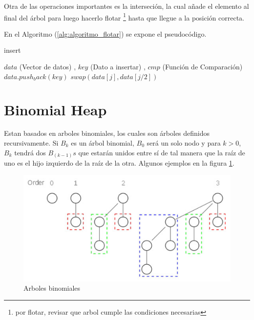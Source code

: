 \documentclass[a4paper,10pt]{article}
\begin{document}
	Otra de las operaciones importantes es la interseción, la cual añade el elemento al final del árbol para luego hacerlo flotar \footnote{ por flotar, revisar que arbol cumple las condiciones necesarias} hasta que llegue a la posición correcta.

En el Algoritmo (\ref{alg:algoritmo_flotar}) se expone el pseudocódigo.

\begin{algorithm}[!h]
	
	\caption{insert} \label{alg:algoritmo_flotar}
	\begin{algorithmic} 
\REQUIRE $data$ (Vector de datos) , $key$ (Dato a insertar) , $cmp$ (Función de Comparación)
\STATE $data.push_back(key)$
\STATE $swap(data[j],data[j/2])$
\ENDFOR
\end{algorithmic}
	
\end{algorithm}

\section{Binomial Heap}
Estan basados en arboles binomiales, los cuales son árboles definidos recursivamente. Si $B_k$ es un árbol binomial, $B_0$ será un solo nodo y para $k>0$, $B_k$ tendrá dos $B_{(k-1)}s$ que estarán unidos entre sí de tal manera que la raíz de uno es el hijo izquierdo de la raíz de la otra. Algunos ejemplos en la figura \ref{fig:ArbolBinomial}.

\begin{figure}[!ht]
	\caption{Arboles binomiales}
	\label{fig:ArbolBinomial}
	\begin{center}
	  \includegraphics[scale=1.7]{arbol_binomial.jpg}	
	\end{center}	
\end{figure}
\end{document}
